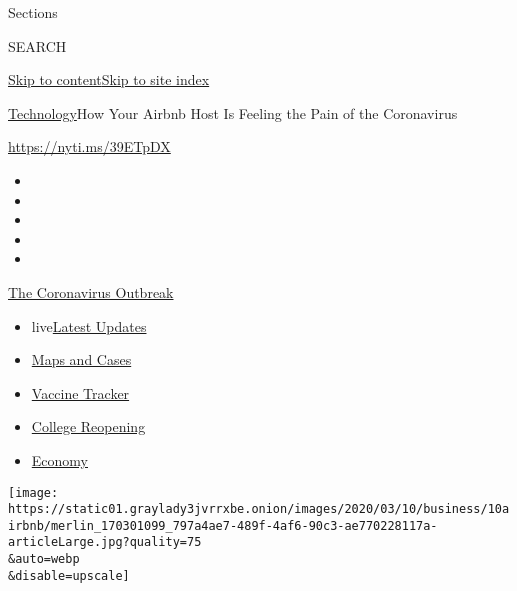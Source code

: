 Sections

SEARCH

\protect\hyperlink{site-content}{Skip to
content}\protect\hyperlink{site-index}{Skip to site index}

\href{/section/technology}{Technology}\textbar{}How Your Airbnb Host Is
Feeling the Pain of the Coronavirus

\url{https://nyti.ms/39ETpDX}

\begin{itemize}
\item
\item
\item
\item
\item
\end{itemize}

\href{https://www.nytimes3xbfgragh.onion/news-event/coronavirus?action=click\&pgtype=Article\&state=default\&region=TOP_BANNER\&context=storylines_menu}{The
Coronavirus Outbreak}

\begin{itemize}
\tightlist
\item
  live\href{https://www.nytimes3xbfgragh.onion/2020/08/03/world/coronavirus-covid-19.html?action=click\&pgtype=Article\&state=default\&region=TOP_BANNER\&context=storylines_menu}{Latest
  Updates}
\item
  \href{https://www.nytimes3xbfgragh.onion/interactive/2020/us/coronavirus-us-cases.html?action=click\&pgtype=Article\&state=default\&region=TOP_BANNER\&context=storylines_menu}{Maps
  and Cases}
\item
  \href{https://www.nytimes3xbfgragh.onion/interactive/2020/science/coronavirus-vaccine-tracker.html?action=click\&pgtype=Article\&state=default\&region=TOP_BANNER\&context=storylines_menu}{Vaccine
  Tracker}
\item
  \href{https://www.nytimes3xbfgragh.onion/2020/08/02/us/covid-college-reopening.html?action=click\&pgtype=Article\&state=default\&region=TOP_BANNER\&context=storylines_menu}{College
  Reopening}
\item
  \href{https://www.nytimes3xbfgragh.onion/live/2020/08/03/business/stock-market-today-coronavirus?action=click\&pgtype=Article\&state=default\&region=TOP_BANNER\&context=storylines_menu}{Economy}
\end{itemize}

\texttt{[image: https://static01.graylady3jvrrxbe.onion/images/2020/03/10/business/10airbnb/merlin\_170301099\_797a4ae7-489f-4af6-90c3-ae770228117a-articleLarge.jpg?quality=75\\\&auto=webp\\\&disable=upscale]}


